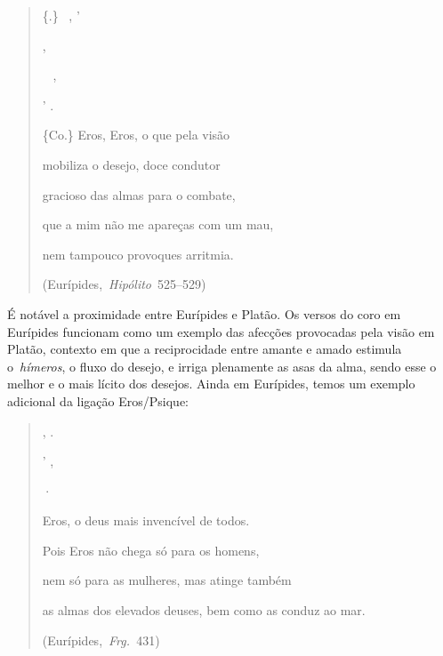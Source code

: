 \begin{quote}
\{.\}~ ,  ' 

 ,  

~  ,

     

'  .

 

\{Co.\} Eros, Eros, o que pela visão

mobiliza o desejo, doce condutor

gracioso das almas para o combate,

que a mim não me apareças com um mau,

nem tampouco provoques arritmia.

 

(Eurípides,~\emph{Hipólito}~525--529)
\end{quote}

 

É notável a proximidade entre Eurípides e Platão. Os versos do coro em
Eurípides funcionam como um exemplo das afecções provocadas pela visão
em Platão, contexto em que a reciprocidade entre amante e amado estimula
o~\emph{hímeros}, o fluxo do desejo, e irriga plenamente as asas da
alma, sendo esse o melhor e o mais lícito dos desejos. Ainda em
Eurípides, temos um exemplo adicional da ligação Eros/\allowbreak{}Psique:

 

\begin{quote}
,   .

     

'  ,    

    ·

 

Eros, o deus mais invencível de todos.

Pois Eros não chega só para os homens,

nem só para as mulheres, mas atinge também

as almas dos elevados deuses, bem como as conduz ao mar.

 

(Eurípides,~\emph{Frg.~}431)
\end{quote}

